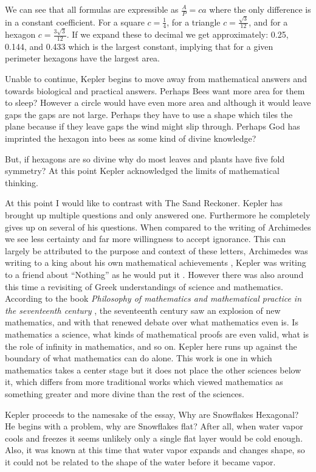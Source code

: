 \documentclass{report}
\begin{document}
We can see that all formulas are expressible as $\frac{A}{P} = ca$ where the only difference is in a constant coefficient. 
For a square $c=\frac{1}{4}$, for a triangle $c=\frac{\sqrt{3}}{12}$, and for a hexagon $c=\frac{3\sqrt{3}}{12}$. If we 
expand these to decimal we get approximately: 0.25, 0.144, and 0.433 which is the largest constant, implying that for a given 
perimeter hexagons have the largest area.

Unable to continue, Kepler begins to move away from mathematical answers and towards biological and practical answers. 
Perhaps Bees want more area for them to sleep? However a circle would have even more area and although it would leave gaps the 
gaps are not large. Perhaps they have to use a shape which tiles the plane because if they leave gaps the wind might slip through. 
Perhaps God has imprinted the hexagon into bees as some kind of divine knowledge?

But, if hexagons are so divine why do most leaves and plants have five fold symmetry? At this point Kepler acknowledged the limits 
of mathematical thinking. 

At this point I would like to contrast with The Sand Reckoner. Kepler has brought up multiple questions and only answered one. 
Furthermore he completely gives up on several of his questions. When compared to the writing of Archimedes we see less certainty 
and far more willingness to accept ignorance. This can largely be attributed to the purpose and context of these letters, 
Archimedes was writing to a king about his own mathematical achievements \cite{sand}, Kepler was writing to a friend about “Nothing” as he 
would put it \cite[p.3]{kepflake}. However there was also around this time a revisiting of Greek understandings of science and mathematics. According
to the book \textit{Philosophy of mathematics and mathematical practice in the seventeenth century} \cite[p.10-12]{math17}, the seventeenth century saw an 
explosion of new mathematics, and with that renewed debate over what mathematics even is. Is mathematics a science, what kinds 
of mathematical proofs are even valid, what is the role of infinity in mathematics, and so on. Kepler here runs up against the 
boundary of what mathematics can do alone. This work is one in which mathematics takes a center stage but it does not place the 
other sciences below it, which differs from more traditional works which viewed mathematics as something greater and more divine 
than the rest of the sciences.

Kepler proceeds to the namesake of the essay, Why are Snowflakes Hexagonal? He begins with a problem, why are Snowflakes flat? 
After all, when water vapor cools and freezes it seems unlikely only a single flat layer would be cold enough. Also, it was known 
at this time that water vapor expands and changes shape, so it could not be related to the shape of the water before it became vapor. 
\end{document}
